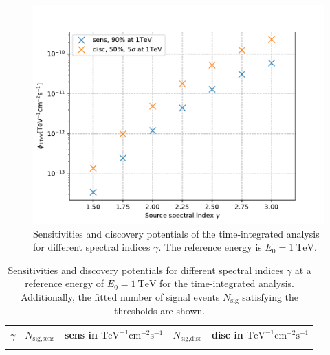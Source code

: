 \begin{figure}
    \centering
    \includegraphics[width=\linewidth]{Plots/05_csky/time_int_sens_gfu_gold_9_years_new.pdf}
    \caption{Sensitivities and discovery potentials of the time-integrated analysis for different spectral indices $\gamma$. The reference energy is $E_0 = \SI{1}{\tera\electronvolt}$.}
    \label{fig:sens_disc_time_int}
\end{figure}
\begin{table}
  \centering
  \caption{Sensitivities and discovery potentials for different spectral indices $\gamma$ at a reference energy of $E_0 = \SI{1}{\tera\electronvolt}$ for the time-integrated analysis. Additionally, the fitted number of signal events $N_\text{sig}$ satisfying the thresholds are shown.}
  \begin{tabular}{crcrc}
    \toprule
    $\gamma$ & $N_\text{sig,sens}$ &  sens in $\si{\tera\electronvolt\tothe{-1}\centi\meter\tothe{-2}\second\tothe{-1}}$ & $N_\text{sig,disc}$ & disc in $\si{\tera\electronvolt\tothe{-1}\centi\meter\tothe{-2}\second\tothe{-1}}$ \\
    \toprule
      
    \toprule
    \label{tab:sens_disc_time_int}
  \end{tabular}
\end{table}
